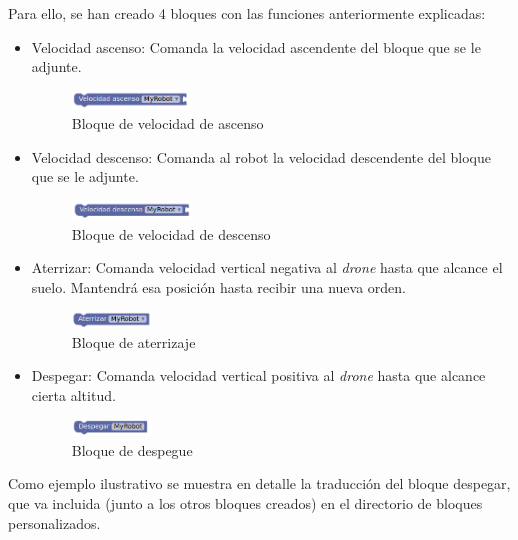 Para ello, se han creado 4 bloques con las funciones anteriormente explicadas: 
\begin{itemize}
    \item Velocidad ascenso: Comanda la velocidad ascendente del bloque que se le adjunte. 
    \begin{figure}[H]
        \centering
        \includegraphics[width=0.3\textwidth]{img/ascensionBlockly.png}
        \caption{Bloque de velocidad de ascenso} \label{fig:ascension}
    \end{figure}
    
    \item Velocidad descenso: Comanda al robot la velocidad descendente del bloque que se le adjunte. 
    \begin{figure}[H]
        \centering
        \includegraphics[width=0.3\textwidth]{img/descensoBlockly.png}
        \caption{Bloque de velocidad de descenso} \label{fig:descenso}
    \end{figure}
    \item Aterrizar: Comanda velocidad vertical negativa al \textit{drone} hasta que alcance el suelo. Mantendrá esa posición hasta recibir una nueva orden.
    \begin{figure}[H]
        \centering
        \includegraphics[width=0.2\textwidth]{img/aterrizarBlockly.png}
        \caption{Bloque de aterrizaje} \label{fig:aterrizaje}
    \end{figure}
    \item Despegar: Comanda velocidad vertical positiva al \textit{drone} hasta que alcance cierta altitud. 
        \begin{figure}[H]
            \centering
            \includegraphics[width=0.2\textwidth]{img/despegarBlockly.png}
            \caption{Bloque de despegue} \label{fig:despegar}
        \end{figure}
\end{itemize}

 Como ejemplo ilustrativo se muestra en detalle la traducción del bloque despegar, que va incluida (junto a los otros bloques creados) en el directorio de bloques personalizados.

